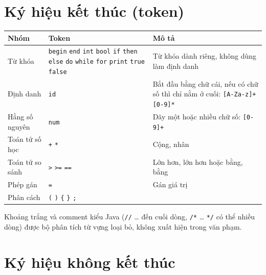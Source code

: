 \documentclass[11pt,a4paper]{article}
\newcommand{\tm}[1]{\texttt{\textcolor{upltok}{#1}}}
\begin{document}
\section{Ký hiệu kết thúc (token)}

\begin{table}[h]
\centering
\begin{tabularx}{\linewidth}{@{}l >{\raggedright\arraybackslash}p{4.6cm} X@{}}
\toprule
\textbf{Nhóm} & \textbf{Token} & \textbf{Mô tả} \\
\midrule
Từ khóa & \tm{begin} \tm{end} \tm{int} \tm{bool} \tm{if} \tm{then} \tm{else}
          \tm{do} \tm{while} \tm{for} \tm{print} \tm{true} \tm{false}
        & Từ khóa dành riêng, không dùng làm định danh \\
\addlinespace
Định danh & \tm{id}
          & Bắt đầu bằng chữ cái, nếu có chữ số thì chỉ nằm ở cuối:
            \texttt{[A-Za-z]+[0-9]*} \\
\addlinespace
Hằng số nguyên & \tm{num}
               & Dãy một hoặc nhiều chữ số: \texttt{[0-9]+} \\
\addlinespace
Toán tử số học & \tm{+} \tm{*} & Cộng, nhân \\
\addlinespace
Toán tử so sánh & \tm{>} \tm{>=} \tm{==}
                & Lớn hơn, lớn hơn hoặc bằng, bằng \\
\addlinespace
Phép gán & \tm{=} & Gán giá trị \\
\addlinespace
Phân cách & \tm{(} \tm{)} \tm{\{} \tm{\}} \tm{;} & \\
\bottomrule
\end{tabularx}
\end{table}

Khoảng trắng và comment kiểu Java (\texttt{//} \dots{} đến cuối dòng,
\texttt{/*} \dots{} \texttt{*/} có thể nhiều dòng) được bộ phân tích từ vựng
loại bỏ, không xuất hiện trong văn phạm.

\section{Ký hiệu không kết thúc}
\end{document}
